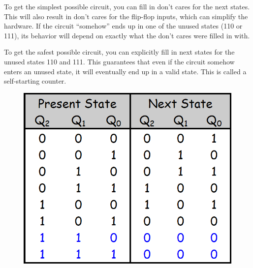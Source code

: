 To get the simplest possible circuit, you can fill in don't cares for the next states. This will also result in don't cares for the flip-flop inputs, which can simplify the hardware. If the circuit ``somehow'' ends up in one of the unused states (110 or 111), its behavior will depend on exactly what the don't cares were filled in with.

To get the safest possible circuit, you can explicitly fill in next states for the unused states 110 and 111. This guarantees that even if the circuit somehow enters an unused state, it will eventually end up in a valid state. This is called a self-starting counter.

\begin{figure}[H]
  \centering
  \begin{minipage}{0.49\linewidth}
    \centering
    \includegraphics[width=\linewidth]{img/self-starting-counter-table.png}
    \label{fig:self-starting-counter-table.png}
  \end{minipage}\hfill
  \begin{minipage}{0.49\linewidth}
    \centering

\end{minipage}
\end{figure}

